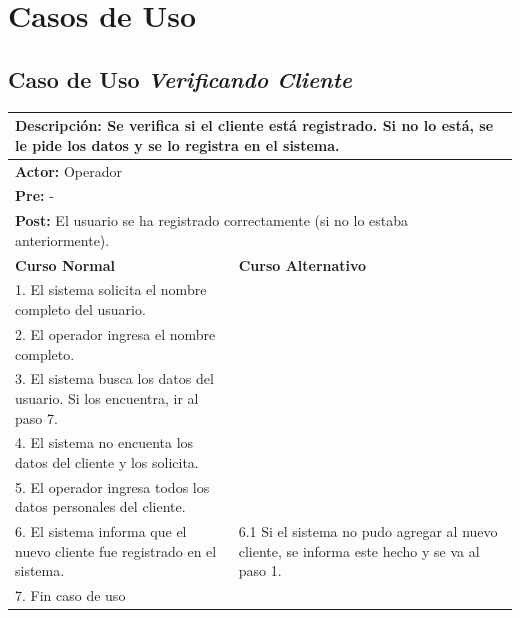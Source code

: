 \documentclass[a4paper]{article}
\begin{document}
\section{Casos de Uso}


\subsection{Caso de Uso \textit{Verificando Cliente}}
\begin{center}
\begin{tabular}{|p{10cm} | p{6cm}|}
\hline
\multicolumn{2}{|p{16cm}|}{\textbf{Descripci\'on:} Se verifica si el cliente est\'a registrado. Si no lo est\'a, se le pide los datos y se lo registra en el sistema.} \\
\hline
\multicolumn{2}{|l|}{\textbf{Actor:} Operador} \\
\hline
\multicolumn{2}{|l|}{\textbf{Pre:} -} \\
\hline
\multicolumn{2}{|p{14cm}|}{\textbf{Post:} El usuario se ha registrado correctamente (si no lo estaba anteriormente).}\\
\hline
\textbf{Curso Normal}  & \textbf{Curso Alternativo} \\ \hline

1. El sistema solicita el nombre completo del usuario. & \\ \hline
2. El operador ingresa el nombre completo. & \\ \hline
3. El sistema busca los datos del usuario. Si los encuentra, ir al paso 7. & \\ \hline
4. El sistema no encuenta los datos del cliente y los solicita. & \\ \hline
5. El operador ingresa todos los datos personales del cliente. & \\ \hline
6. El sistema informa que el nuevo cliente fue registrado en el sistema. & 6.1 Si el sistema no pudo agregar al nuevo cliente, se informa este hecho y se va al paso 1. \\ \hline
7. Fin caso de uso & \\ \hline
\end{tabular}
\end{center}
\end{document}
